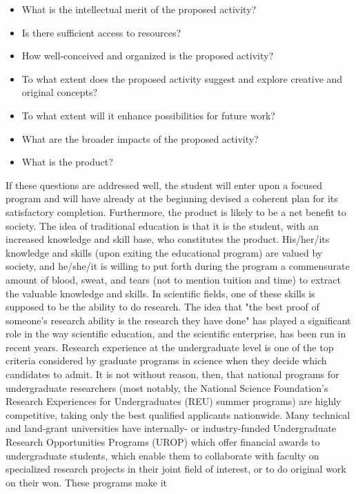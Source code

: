\begin{itemize}
\item What is the intellectual merit of the proposed activity?
\item Is there sufficient access to resources?
\item How well-conceived and organized is the proposed activity?
\item To what extent does the proposed activity suggest and
  explore creative and original concepts?
\item To what extent will it enhance possibilities for future work?
\item What are the broader impacts of the proposed activity?
\item What is the product?
\end{itemize}

If these questions are addressed well, the student will enter
upon a focused program and will have already at the beginning
devised a coherent plan for its satisfactory completion.
Furthermore, the product is likely to be a net benefit to society.
The idea of traditional education is that it is the student,
with an increased knowledge and skill base, who constitutes
the product.  His/her/its knowledge and skills (upon exiting
the educational program) are valued by society, and he/she/it
is willing to put forth during the program a commensurate amount
of blood, sweat, and tears (not to mention tuition and time) to
extract the valuable knowledge and skills.  In scientific fields,
one of these skills is supposed to be the ability to do research.
The idea that "the best proof of someone's research ability is
the research they have done" has played a significant role in the
way scientific education, and the scientific enterprise, has
been run in recent years.  Research experience at the undergraduate
level is one of the top criteria considered by graduate programs
in science when they decide which candidates to admit.  It is not
without reason, then, that national programs for undergraduate
researchers (most notably, the National Science Foundation's
Research Experiences for Undergraduates (REU) summer programs)
are highly competitive, taking only the best qualified applicants
nationwide.  Many technical and land-grant universities have
internally- or industry-funded Undergraduate Research Opportunities
Programs (UROP) which offer financial awards to undergraduate
students, which enable them to collaborate with faculty on
specialized research projects in their joint field of interest,
or to do original work on their won.  These programs make it
